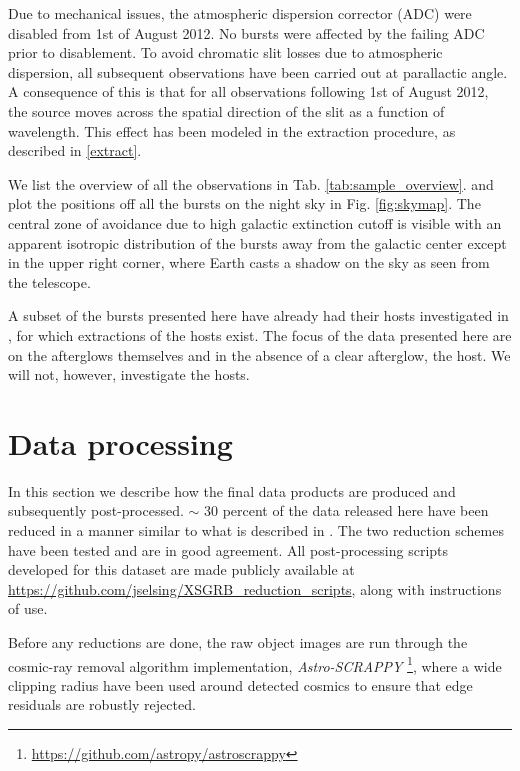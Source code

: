 \documentclass{aa}    %
\begin{document}
Due to mechanical issues, the atmospheric dispersion corrector (ADC) were
disabled from 1st of August 2012. No bursts were affected by the failing ADC
prior to disablement. To avoid chromatic slit losses due to atmospheric
dispersion, all subsequent observations have been carried out at parallactic
angle. A consequence of this is that for all observations following 1st of
August 2012, the source moves across the spatial direction of the slit as a
function of wavelength. This effect has been modeled in the extraction
procedure, as described in \ref{extract}.

We list the overview of all the observations in Tab. \ref{tab:sample_overview}.
 and plot the positions off all the bursts on
the night sky in Fig. \ref{fig:skymap}. The central zone of avoidance due to
high galactic extinction cutoff is visible with an apparent isotropic
distribution of the bursts away from the galactic center except in the upper
right corner, where Earth casts a shadow on the sky as seen from the telescope.

A subset of the bursts presented here  have already had their hosts investigated
in \citet{Kruhler2015}, for which extractions of the hosts exist. The focus of
the data presented here are on the afterglows themselves and in the absence of a
clear afterglow, the host. We will not, however, investigate the hosts.

\section{Data processing}

In this section we describe how the final data products are produced and
subsequently post-processed. $\sim$ 30 percent of the data released here have
been reduced in a manner similar to what is described in \citet{Kruhler2015}.
The two reduction schemes have been tested and are in good agreement. All
post-processing scripts developed for this dataset are made publicly available
at \url{https://github.com/jselsing/XSGRB_reduction_scripts}, along with
instructions of use.

Before any reductions are done, the raw object images are run through the
cosmic-ray removal algorithm \citep{VanDokkum2001} implementation,
\textit{Astro-SCRAPPY} \footnote{\url{https://github.com/astropy/astroscrappy}},
where a wide clipping radius have been used around detected cosmics to ensure that edge residuals are
robustly rejected. 
\end{document}

